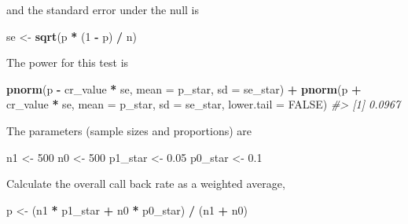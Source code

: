 \documentclass[]{book}
\newenvironment{Shaded}{\begin{snugshade}}{\end{snugshade}}
\newcommand{\CommentTok}[1]{\textcolor[rgb]{0.56,0.35,0.01}{\textit{#1}}}
\newcommand{\DataTypeTok}[1]{\textcolor[rgb]{0.13,0.29,0.53}{#1}}
\newcommand{\DecValTok}[1]{\textcolor[rgb]{0.00,0.00,0.81}{#1}}
\newcommand{\FloatTok}[1]{\textcolor[rgb]{0.00,0.00,0.81}{#1}}
\newcommand{\KeywordTok}[1]{\textcolor[rgb]{0.13,0.29,0.53}{\textbf{#1}}}
\newcommand{\NormalTok}[1]{#1}
\newcommand{\OperatorTok}[1]{\textcolor[rgb]{0.81,0.36,0.00}{\textbf{#1}}}
\newcommand{\OtherTok}[1]{\textcolor[rgb]{0.56,0.35,0.01}{#1}}
\newcommand{\StringTok}[1]{\textcolor[rgb]{0.31,0.60,0.02}{#1}}
\theoremstyle{definition}
\theoremstyle{definition}
\theoremstyle{definition}
\theoremstyle{remark}
\begin{document}
and the standard error under the null is

\begin{Shaded}
\begin{Highlighting}[]
\NormalTok{se <-}\StringTok{ }\KeywordTok{sqrt}\NormalTok{(p }\OperatorTok{*}\StringTok{ }\NormalTok{(}\DecValTok{1} \OperatorTok{-}\StringTok{ }\NormalTok{p) }\OperatorTok{/}\StringTok{ }\NormalTok{n)}
\end{Highlighting}
\end{Shaded}

The power for this test is

\begin{Shaded}
\begin{Highlighting}[]
\KeywordTok{pnorm}\NormalTok{(p }\OperatorTok{-}\StringTok{ }\NormalTok{cr_value }\OperatorTok{*}\StringTok{ }\NormalTok{se, }\DataTypeTok{mean =}\NormalTok{ p_star, }\DataTypeTok{sd =}\NormalTok{ se_star) }\OperatorTok{+}
\StringTok{    }\KeywordTok{pnorm}\NormalTok{(p }\OperatorTok{+}\StringTok{ }\NormalTok{cr_value }\OperatorTok{*}\StringTok{ }\NormalTok{se, }\DataTypeTok{mean =}\NormalTok{ p_star, }\DataTypeTok{sd =}\NormalTok{ se_star,}
          \DataTypeTok{lower.tail =} \OtherTok{FALSE}\NormalTok{)}
\CommentTok{#> [1] 0.0967}
\end{Highlighting}
\end{Shaded}

The parameters (sample sizes and proportions) are

\begin{Shaded}
\begin{Highlighting}[]
\NormalTok{n1 <-}\StringTok{ }\DecValTok{500}
\NormalTok{n0 <-}\StringTok{ }\DecValTok{500}
\NormalTok{p1_star <-}\StringTok{ }\FloatTok{0.05}
\NormalTok{p0_star <-}\StringTok{ }\FloatTok{0.1}
\end{Highlighting}
\end{Shaded}

Calculate the overall call back rate as a weighted average,

\begin{Shaded}
\begin{Highlighting}[]
\NormalTok{p <-}\StringTok{ }\NormalTok{(n1 }\OperatorTok{*}\StringTok{ }\NormalTok{p1_star }\OperatorTok{+}\StringTok{ }\NormalTok{n0 }\OperatorTok{*}\StringTok{ }\NormalTok{p0_star) }\OperatorTok{/}\StringTok{ }\NormalTok{(n1 }\OperatorTok{+}\StringTok{ }\NormalTok{n0)}
\end{Highlighting}
\end{Shaded}
\end{document}
